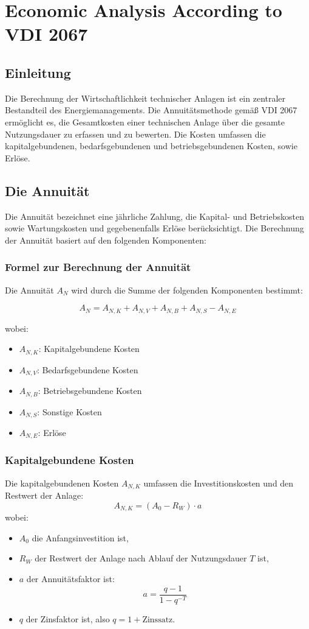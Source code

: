 \section{Economic Analysis According to VDI 2067}
\label{sec:annuity_doc}

\subsection{Einleitung}
Die Berechnung der Wirtschaftlichkeit technischer Anlagen ist ein zentraler Bestandteil des Energiemanagements. Die Annuitätsmethode gemäß VDI 2067 ermöglicht es, die Gesamtkosten einer technischen Anlage über die gesamte Nutzungsdauer zu erfassen und zu bewerten. Die Kosten umfassen die kapitalgebundenen, bedarfsgebundenen und betriebsgebundenen Kosten, sowie Erlöse.

\subsection{Die Annuität}
Die Annuität bezeichnet eine jährliche Zahlung, die Kapital- und Betriebskosten sowie Wartungskosten und gegebenenfalls Erlöse berücksichtigt. Die Berechnung der Annuität basiert auf den folgenden Komponenten:

\subsubsection{Formel zur Berechnung der Annuität}
Die Annuität \(A_N\) wird durch die Summe der folgenden Komponenten bestimmt:

\[
A_N = A_{N,K} + A_{N,V} + A_{N,B} + A_{N,S} - A_{N,E}
\]

wobei:
\begin{itemize}
    \item \(A_{N,K}\): Kapitalgebundene Kosten
    \item \(A_{N,V}\): Bedarfsgebundene Kosten
    \item \(A_{N,B}\): Betriebsgebundene Kosten
    \item \(A_{N,S}\): Sonstige Kosten
    \item \(A_{N,E}\): Erlöse
\end{itemize}

\subsubsection{Kapitalgebundene Kosten}
Die kapitalgebundenen Kosten \(A_{N,K}\) umfassen die Investitionskosten und den Restwert der Anlage:
\[
A_{N,K} = (A_0 - R_W) \cdot a
\]
wobei:
\begin{itemize}
    \item \(A_0\) die Anfangsinvestition ist,
    \item \(R_W\) der Restwert der Anlage nach Ablauf der Nutzungsdauer \(T\) ist,
    \item \(a\) der Annuitätsfaktor ist:
    \[
    a = \frac{q - 1}{1 - q^{-T}}
    \]
    \item \(q\) der Zinsfaktor ist, also \(q = 1 + \text{Zinssatz}\).
\end{itemize}

